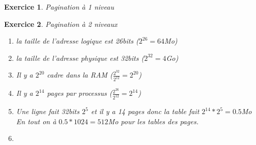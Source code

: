 \documentclass{article}
\theoremstyle{plain}
\newtheorem{exo}{Exercice}%
\begin{document}
\begin{exo} Pagination à 1 niveau
    
\end{exo}

\begin{exo} Pagination à 2 niveaux
\begin{enumerate}
    \item la taille de l'adresse logique est 26bits ($2^{26} = 64$Mo)
    \item la taille de l'adresse physique est 32bits ($2^{32} = 4$Go)
    \item Il y a $2^{20}$ cadre dans la RAM ($\frac{2^{32}}{2^{12}} = 2^{20}$)
    \item Il y a $2^{14}$ pages par processus ($\frac{2^{26}}{2^{12}} = 2^{14}$)
    \item Une ligne fait 32bits $2^5$ et il y a 14 pages donc la table fait $2^{14} * 2^5 = 0.5$Mo\\
        En tout on à $0.5 * 1024 = 512$Mo pour les tables des pages.
    \item 
\end{enumerate}
\end{exo}
\end{document}

